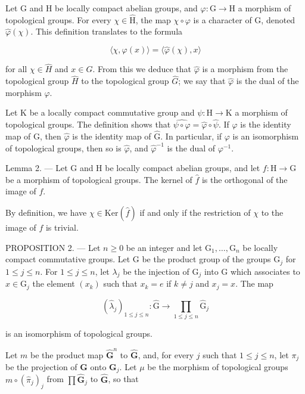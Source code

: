 Let G and H be locally compact abelian groups, and \(\varphi\colon\mathrm{G}\to\mathrm{H}\) a morphism of topological groups. For every \(\chi\in\widehat{\mathrm{H}}\), the map \(\chi\circ\varphi\) is a character of G, denoted \(\widehat{\varphi}(\chi)\). This definition translates to the formula

\[
\langle \chi , \varphi (x) \rangle = \langle \widehat {\varphi} (\chi), x \rangle\tag{4}
\]

for all \(\chi\in\widehat{H}\) and \(x\in G\). From this we deduce that \(\widehat{\varphi}\) is a morphism from the topological group \(\widehat{H}\) to the topological group \(\widehat{G}\); we say that \(\widehat{\varphi}\) is the dual of the morphism \(\varphi\).

Let K be a locally compact commutative group and \(\psi\colon\mathrm{H}\to\mathrm{K}\) a morphism of topological groups. The definition shows that \(\widehat{\psi\circ\varphi}=\widehat{\varphi}\circ\widehat{\psi}\). If \(\varphi\) is the identity map of G, then \(\widehat{\varphi}\) is the identity map of \(\widehat{\mathrm{G}}\). In particular, if \(\varphi\) is an isomorphism of topological groups, then so is \(\widehat{\varphi}\), and \(\widehat{\varphi}^{-1}\) is the dual of \(\varphi^{-1}\).

Lemma 2. --- Let G and H be locally compact abelian groups, and let \(f\colon\mathrm{H}\to\mathrm{G}\) be a morphism of topological groups. The kernel of \(\widehat{f}\) is the orthogonal of the image of \(f\).

By definition, we have \(\chi \in \mathrm{Ker}(\widehat{f})\) if and only if the restriction of \(\chi\) to the image of \(f\) is trivial.

PROPOSITION 2. --- Let \(n \geqslant 0\) be an integer and let \(\mathrm{G}_{1}, \ldots, \mathrm{G}_{n}\) be locally compact commutative groups. Let G be the product group of the groups \(\mathrm{G}_{j}\) for \(1 \leqslant j \leqslant n\). For \(1 \leqslant j \leqslant n\), let \(\lambda_{j}\) be the injection of \(\mathrm{G}_{j}\) into G which associates to \(x \in \mathrm{G}_{j}\) the element \((x_{k})\) such that \(x_{k} = e\) if \(k \neq j\) and \(x_{j} = x\). The map

\[
(\widehat {\lambda} _ {j}) _ {1 \leqslant j \leqslant n} \colon \widehat {\mathrm{G}} \to \prod_ {1 \leqslant j \leqslant n} \widehat {\mathrm{G}} _ {j}
\]

is an isomorphism of topological groups.

Let \(m\) be the product map \(\widehat{\mathbf{G}}^n\) to \(\widehat{\mathbf{G}}\), and, for every \(j\) such that \(1 \leqslant j \leqslant n\), let \(\pi_j\) be the projection of \(\mathbf{G}\) onto \(\mathbf{G}_j\). Let \(\mu\) be the morphism of topological groups \(m \circ (\widehat{\pi}_j)_j\) from \(\prod \widehat{\mathbf{G}}_j\) to \(\widehat{\mathbf{G}}\), so that

